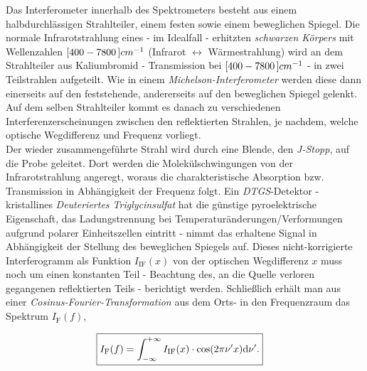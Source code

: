 \documentclass[a4paper,10pt,twocolumn]{article}
\newcommand{\diff}{\textnormal{d}}
\newcommand{\ix}[1]{_\text{#1}}
\newcommand{\tilt}[1]{\textit{#1}}
\begin{document}
		Das Interferometer innerhalb des Spektrometers besteht aus einem halbdurchl\"assigen Strahlteiler, einem festen sowie einem beweglichen Spiegel. Die normale Infrarotstrahlung eines - im Idealfall - erhitzten \tilt{schwarzen K\"orpers} \cite{FTIRSpek} mit Wellenzahlen $\unit[[400-7800]]{cm^{-1}}$ (Infrarot $\leftrightarrow$ W\"armestrahlung) wird an dem Strahlteiler aus Kaliumbromid - Transmission bei $\unit[[400-7800]]{cm^{-1}}$ - in zwei Teilstrahlen aufgeteilt. Wie in einem \tilt{Michelson-Interferometer} werden diese dann einerseits auf den feststehende, andererseits auf den beweglichen Spiegel gelenkt. Auf dem selben Strahlteiler kommt es danach zu verschiedenen Interferenzerscheinungen zwischen den reflektierten Strahlen, je nachdem, welche optische Wegdifferenz und Frequenz vorliegt.\\
		Der wieder zusammengef\"uhrte Strahl wird durch eine Blende, den \tilt{J-Stopp}, auf die Probe geleitet. Dort werden die Molek\"ulschwingungen von der Infrarotstrahlung angeregt, woraus die charakteristische Absorption bzw. Transmission in Abh\"angigkeit der Frequenz folgt. Ein \tilt{DTGS}-Detektor - kristallines \tilt{Deuteriertes Triglycinsulfat} hat die g\"unstige pyroelektrische Eigenschaft, das Ladungstrennung bei Temperatur\"anderungen/Verformungen aufgrund polarer Einheitszellen eintritt - nimmt das erhaltene Signal in Abh\"angigkeit der Stellung des beweglichen Spiegels auf. Dieses nicht-korrigierte Interferogramm als Funktion $I\ix{IF}(x)$ von der optischen Wegdifferenz $x$ muss noch um einen konstanten Teil - Beachtung des, an die Quelle verloren gegangenen reflektierten Teils - berichtigt werden. Schlie{\ss}lich erh\"alt man aus einer  \tilt{Cosinus-Fourier-Transformation} aus dem Orts- in den Frequenzraum das Spektrum $I\ix{F}(f)$,
		
			\begin{align}
				\Aboxed{
				I\ix{F}(f)=\int_{-\infty}^{+\infty}I\ix{IF}(x)\cdot\cos(2\pi\nu^{\prime}x)\diff \nu^{\prime}.
				}
				\label{eq:fourier}
			\end{align}
		
\end{document}
